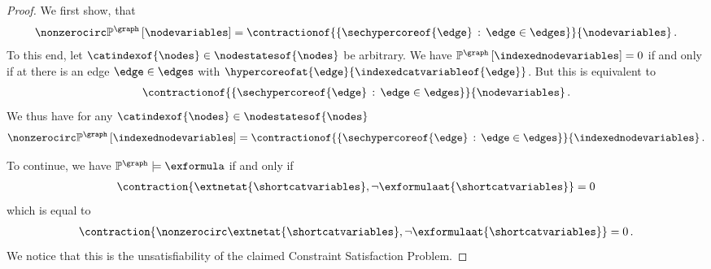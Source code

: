 \begin{proof}
    We first show, that
    \begin{align*}
        \nonzerocirc\probofat{\graph}{\nodevariables} =
        \contractionof{\{\sechypercoreof{\edge} \wcols \edge\in\edges \}}{\nodevariables} \, . %
    \end{align*}
    To this end, let $\catindexof{\nodes}\in\nodestatesof{\nodes}$ be arbitrary.
    We have $\probofat{\graph}{\indexednodevariables}=0$ if and only if at there is an edge $\edge\in\edges$ with $\hypercoreofat{\edge}{\indexedcatvariableof{\edge}}$.
    But this is equivalent to
    \begin{align*}
        \contractionof{\{\sechypercoreof{\edge} \wcols \edge\in\edges \}}{\nodevariables} \, .
    \end{align*}
    We thus have for any $\catindexof{\nodes}\in\nodestatesof{\nodes}$
    \begin{align*}
        \nonzerocirc\probofat{\graph}{\indexednodevariables} =
        \contractionof{\{\sechypercoreof{\edge} \wcols \edge\in\edges \}}{\indexednodevariables} \, . %
    \end{align*}

    To continue, we have $\probof{\graph}\models\exformula$ if and only if
    \begin{align*}
        \contraction{\extnetat{\shortcatvariables},\lnot\exformulaat{\shortcatvariables}} = 0
    \end{align*}
    which is equal to
    \begin{align*}
        \contraction{\nonzerocirc\extnetat{\shortcatvariables},\lnot\exformulaat{\shortcatvariables}} = 0 \, .
    \end{align*}
    We notice that this is the unsatisfiability of the claimed Constraint Satisfaction Problem.

\end{proof}

